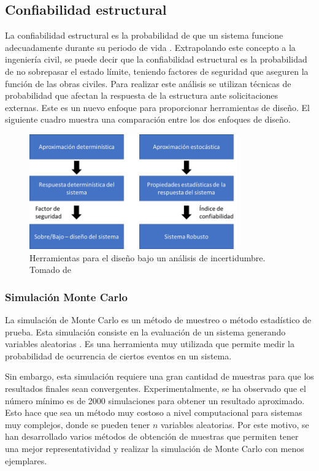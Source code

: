 \subsection{Confiabilidad estructural}
La confiabilidad estructural es la probabilidad de que un sistema funcione adecuadamente durante su periodo de vida \cite{choi2006}. Extrapolando este concepto a la ingeniería civil, se puede decir que la confiabilidad estructural es la probabilidad de no sobrepasar el estado límite, teniendo factores de seguridad que aseguren la función de las obras civiles. Para realizar este análisis se utilizan técnicas de probabilidad que afectan la respuesta de la estructura ante solicitaciones externas. Este es un nuevo enfoque para proporcionar herramientas de diseño. El siguiente cuadro muestra una comparación entre los dos enfoques de diseño.

\begin{figure}[H]
    \centering
    \includegraphics[width=0.8\textwidth]{Imagenes/figure1.png} %
    \caption{Herramientas para el diseño bajo un análisis de incertidumbre. Tomado de \protect\cite{choi2006}}
    \label{fig:design_tools}
\end{figure}

\subsubsection{Simulación Monte Carlo}
La simulación de Monte Carlo es un método de muestreo o método estadístico de prueba. Esta simulación consiste en la evaluación de un sistema generando variables aleatorias \cite{choi2006}. Es una herramienta muy utilizada que permite medir la probabilidad de ocurrencia de ciertos eventos en un sistema. 

Sin embargo, esta simulación requiere una gran cantidad de muestras para que los resultados finales sean convergentes. Experimentalmente, se ha observado que el número mínimo es de 2000 simulaciones para obtener un resultado aproximado. Esto hace que sea un método muy costoso a nivel computacional para sistemas muy complejos, donde se pueden tener \(n\) variables aleatorias. Por este motivo, se han desarrollado varios métodos de obtención de muestras que permiten tener una mejor representatividad y realizar la simulación de Monte Carlo con menos ejemplares.

